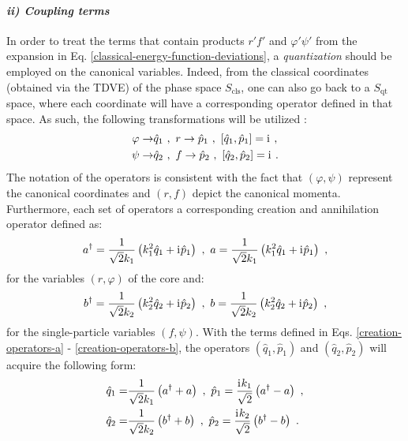 \paragraph*{\textit{ii) Coupling terms}}
In order to treat the terms that contain products $r'f'$ and $\varphi'\psi'$ from the expansion in Eq. \ref{classical-energy-function-deviations}, a \emph{quantization} should be employed on the canonical variables. Indeed, from the classical coordinates (obtained via the TDVE) of the phase space $S_\text{cls}$, one can also go back to a $S_\text{qt}$ space, where each coordinate will have a corresponding operator defined in that space. As such, the following transformations will be utilized \cite{raduta2020approach}:
\begin{align}
    \varphi\to&\hat{q}_1\ ,\ r\to\hat{p}_1\ ,\ \left[\hat{q}_1,\hat{p}_1\right]=\iu\ ,\nonumber\\
    \psi\to&\hat{q}_2\ ,\ f\to\hat{p}_2\ ,\ \left[\hat{q}_2,\hat{p}_2\right]=\iu\ .
    \label{canonical-coordinates-quantized}
\end{align}
The notation of the operators is consistent with the fact that $(\varphi,\psi)$ represent the canonical coordinates and $(r,f)$ depict the canonical momenta. Furthermore, each set of operators a corresponding creation and annihilation operator defined as:
\begin{align}
    a^\dagger=\frac{1}{\sqrt{2}k_1}\left(k_1^2\hat{q}_1+ \mathrm{i}\mkern1mu \hat{p}_1\right)\ ,\ a=\frac{1}{\sqrt{2}k_1}\left(k_1^2\hat{q}_1+ \mathrm{i}\mkern1mu \hat{p}_1\right)\ ,
    \label{creation-operators-a}
\end{align}
for the variables $(r,\varphi)$ of the core and:
\begin{align}
    b^\dagger=\frac{1}{\sqrt{2}k_2}\left(k_2^2\hat{q}_2+ \mathrm{i}\mkern1mu \hat{p}_2\right)\ ,\ b=\frac{1}{\sqrt{2}k_2}\left(k_2^2\hat{q}_2+ \mathrm{i}\mkern1mu \hat{p}_2\right)\ ,
    \label{creation-operators-b}
\end{align}
for the single-particle variables $(f,\psi)$. With the terms defined in Eqs. \ref{creation-operators-a} - \ref{creation-operators-b}, the operators $(\hat{q}_1,\hat{p}_1)$ and $(\hat{q}_2,\hat{p}_2)$ will acquire the following form:
\begin{align}
    \hat{q}_1=&\frac{1}{\sqrt{2}k_1}\left(a^\dagger+a\right)\ ,\ \hat{p}_1=\frac{\iu k_1}{\sqrt{2}}\left(a^\dagger-a\right)\ ,\nonumber\\
    \hat{q}_2=&\frac{1}{\sqrt{2}k_2}\left(b^\dagger+b\right)\ ,\ \hat{p}_2=\frac{\iu k_2}{\sqrt{2}}\left(b^\dagger-b\right)\ .
    \label{canonical-transformations-ab-qp}
\end{align}

